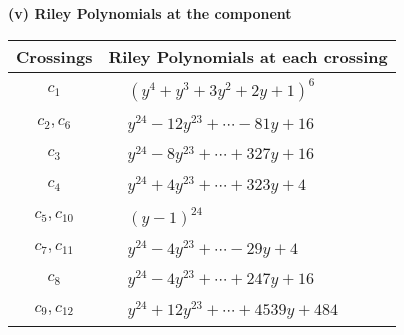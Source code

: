 \documentclass[1p]{elsarticle_modified}
\theoremstyle{definition}
\begin{document}
\newpage\renewcommand{\arraystretch}{1}
\flushleft \textbf{(v) Riley Polynomials at the component}\newline \\
\begin{tabular}{m{50pt}|m{274pt}}
Crossings & \hspace{64pt}Riley Polynomials at each crossing \\
\hline $$\begin{aligned}c_{1}\end{aligned}$$&$\begin{aligned}
&(y^4+y^3+3 y^2+2 y+1)^6
\end{aligned}$\\
\hline $$\begin{aligned}c_{2},c_{6}\end{aligned}$$&$\begin{aligned}
&y^{24}-12 y^{23}+\cdots-81 y+16
\end{aligned}$\\
\hline $$\begin{aligned}c_{3}\end{aligned}$$&$\begin{aligned}
&y^{24}-8 y^{23}+\cdots+327 y+16
\end{aligned}$\\
\hline $$\begin{aligned}c_{4}\end{aligned}$$&$\begin{aligned}
&y^{24}+4 y^{23}+\cdots+323 y+4
\end{aligned}$\\
\hline $$\begin{aligned}c_{5},c_{10}\end{aligned}$$&$\begin{aligned}
&(y-1)^{24}
\end{aligned}$\\
\hline $$\begin{aligned}c_{7},c_{11}\end{aligned}$$&$\begin{aligned}
&y^{24}-4 y^{23}+\cdots-29 y+4
\end{aligned}$\\
\hline $$\begin{aligned}c_{8}\end{aligned}$$&$\begin{aligned}
&y^{24}-4 y^{23}+\cdots+247 y+16
\end{aligned}$\\
\hline $$\begin{aligned}c_{9},c_{12}\end{aligned}$$&$\begin{aligned}
&y^{24}+12 y^{23}+\cdots+4539 y+484
\end{aligned}$\\
\hline
\end{tabular}\\~\\
\end{document}
